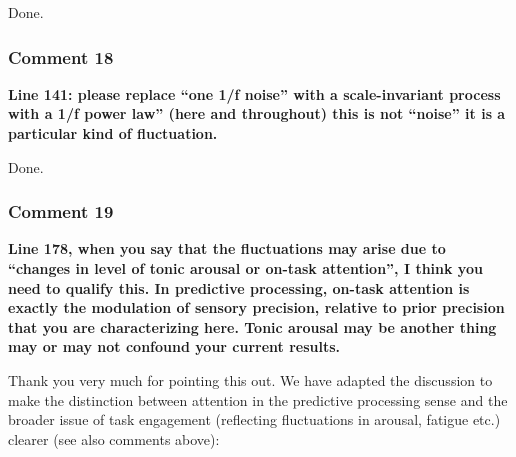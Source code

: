 \documentclass[
]{article}
\begin{document}
Done.

\hypertarget{comment-18}{%
\subsubsection{Comment 18}\label{comment-18}}

\textbf{Line 141: please replace ``one 1/f noise'' with a
scale-invariant process with a 1/f power law'' (here and throughout)
this is not ``noise'' it is a particular kind of fluctuation.}

Done.

\hypertarget{comment-19}{%
\subsubsection{Comment 19}\label{comment-19}}

\textbf{Line 178, when you say that the fluctuations may arise due to
``changes in level of tonic arousal or on-task attention'', I think you
need to qualify this. In predictive processing, on-task attention is
exactly the modulation of sensory precision, relative to prior precision
that you are characterizing here. Tonic arousal may be another thing may
or may not confound your current results.}

Thank you very much for pointing this out. We have adapted the
discussion to make the distinction between attention in the predictive
processing sense and the broader issue of task engagement (reflecting
fluctuations in arousal, fatigue etc.) clearer (see also comments
above):
\end{document}
